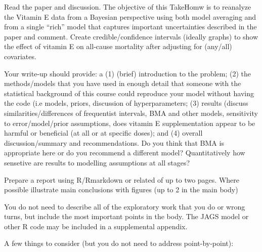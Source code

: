 \documentclass[12pt]{article}
\begin{document}
Read the paper and discussion.  The objective of this TakeHomw is to
reanalyze the Vitamin E data from a Bayesian perspective using both
model averaging and from a single ``rich'' model that captures
important uncertainties described in the paper and comment.  Create
credible/confidence intervals (ideally graphs) to show the effect of
vitamin E on all-cause mortality after adjusting for (any/all)
covariates.  

Your write-up should provide: a (1) (brief) introduction to the
problem; (2) the methods/models that you have used in enough detail
that someone with the statistical background of this course could
reproduce your model without having the code (i.e models, priors,
discussion of hyperparameters; (3) results (discuss
similarities/differences of frequentist intervals, BMA and other
models, sensitivity to error/model/prior assumptions, does vitamin E
supplementation appear to be harmful or beneficial (at all or at
specific doses); and (4) overall discussion/summary and
recommendations.  Do you think that BMA is appropriate here or do you
recommend a different model?  Quantitatively how sensetive are results
to modelling assumptions at all stages?


Prepare a report using R/Rmarkdown or related of up to two pages.
Where possible illustrate main conclusions with figures (up to 2 in
the main body) 

You do not need to describe all of the exploratory work that you do or
wrong turns, but include the most important points in the body.  The
JAGS model  or other R code may be included in a supplemental
appendix.  

A few things to consider (but you do not need to address point-by-point): 
\end{document}
